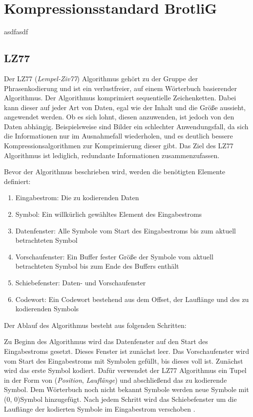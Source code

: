 \section{Kompressionsstandard BrotliG}
\label{sec:brotlig}
asdfasdf


\subsection{LZ77}
\label{subsubsec:lz77}
Der LZ77 (\textit{Lempel-Ziv77}) Algorithmus gehört zu der Gruppe der Phrasenkodierung und ist ein verlustfreier, auf einem Wörterbuch basierender Algorithmus.
Der Algorithmus komprimiert sequentielle Zeichenketten.
Dabei kann dieser auf jeder Art von Daten, egal wie der Inhalt und die Größe aussieht, angewendet werden.
Ob es sich lohnt, diesen anzuwenden, ist jedoch von den Daten abhängig.
Beispielsweise sind Bilder ein schlechter Anwendungsfall, da sich die Informationen nur im Ausnahmefall wiederholen, und es deutlich bessere Kompressionsalgorithmen zur Komprimierung dieser gibt.
Das Ziel des LZ77 Algorithmus ist lediglich, redundante Informationen zusammenzufassen. \newline

Bevor der Algorithmus beschrieben wird, werden die benötigten Elemente definiert:

\begin{enumerate}
\item{Eingabestrom:} Die zu kodierenden Daten
\item{Symbol:} Ein willkürlich gewähltes Element des Eingabestroms
\item{Datenfenster:} Alle Symbole vom Start des Eingabestroms bis zum aktuell betrachteten Symbol
\item{Vorschaufenster:} Ein Buffer fester Größe der Symbole vom aktuell betrachteten Symbol bis zum Ende des Buffers enthält
\item{Schiebefenster:} Daten- und Vorschaufenster
\item{Codewort:} Ein Codewort bestehend aus dem Offset, der Lauflänge und des zu kodierenden Symbols
\end{enumerate}

Der Ablauf des Algorithmus besteht aus folgenden Schritten:

Zu Beginn des Algorithmus wird das Datenfenster auf den Start des Eingabestroms gesetzt.
Dieses Fenster ist zunächst leer.
Das Vorschaufenster wird vom Start des Eingabestroms mit Symbolen gefüllt, bis dieses voll ist.
Zunächst wird das erste Symbol kodiert.
Dafür verwendet der LZ77 Algorithmus ein Tupel in der Form von (\textit{Position}, \textit{Lauflänge}) und abschließend das zu kodierende Symbol.
Dem Wörterbuch noch nicht bekannt Symbole werden neue Symbole mit (0, 0)Symbol hinzugefügt.
Nach jedem Schritt wird das Schiebefenster um die Lauflänge der kodierten Symbole im Eingabestrom verschoben
\cite{lz2023}.

